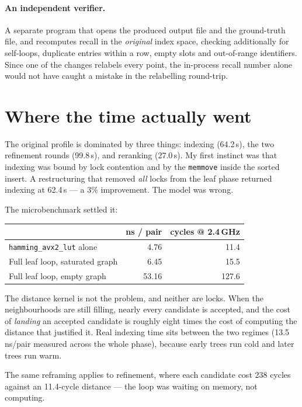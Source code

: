 \documentclass[11pt,a4paper]{article}
\newcommand{\code}[1]{\texttt{\small #1}}
\begin{document}
\paragraph{An independent verifier.} A separate program that opens the produced
output file and the ground-truth file, and recomputes recall in the
\emph{original} index space, checking additionally for self-loops, duplicate
entries within a row, empty slots and out-of-range identifiers. Since one of the
changes relabels every point, the in-process recall number alone would not have
caught a mistake in the relabelling round-trip.

\section{Where the time actually went}

The original profile is dominated by three things: indexing (64.2\,s), the two
refinement rounds (99.8\,s), and reranking (27.0\,s). My first instinct was that
indexing was bound by lock contention and by the \code{memmove} inside the
sorted insert. A restructuring that removed \emph{all} locks from the leaf phase
returned indexing at 62.4\,s --- a 3\% improvement. The model was wrong.

The microbenchmark settled it:

\begin{center}
\begin{tabular}{lrr}
\toprule
& ns / pair & cycles @ 2.4\,GHz \\
\midrule
\code{hamming\_avx2\_lut} alone            & 4.76 & 11.4 \\
Full leaf loop, saturated graph            & 6.45 & 15.5 \\
Full leaf loop, empty graph                & 53.16 & 127.6 \\
\bottomrule
\end{tabular}
\end{center}

\noindent
The distance kernel is not the problem, and neither are locks. When the
neighbourhoods are still filling, nearly every candidate is accepted, and the
cost of \emph{landing} an accepted candidate is roughly eight times the cost of
computing the distance that justified it. Real indexing time sits between the
two regimes (13.5\,ns/pair measured across the whole phase), because early trees
run cold and later trees run warm.

The same reframing applies to refinement, where each candidate cost 238 cycles
against an 11.4-cycle distance --- the loop was waiting on memory, not
computing.
\end{document}
